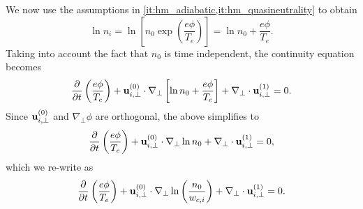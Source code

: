 \documentclass[oneside,a4paper,11pt]{report}
\begin{document}
We now use the assumptions in \cref{it:hm_adiabatic,it:hm_quasineutrality} to obtain
\begin{equation}
    \ln n_i = \ln \left [ n_0 \exp \left ( \frac{e \phi}{T_e} \right ) \right ] = \ln n_0 + \frac{e \phi}{T_e}.
\end{equation}
Taking into account the fact that $n_0$ is time independent, the continuity equation becomes
\begin{equation}
    \frac{\partial}{\partial t} \left ( \frac{e\phi}{T_e} \right ) + \mathbf{u}^{(0)}_{i,\perp} \cdot \nabla_\perp \left [ \ln n_0 + \frac{e \phi}{T_e} \right ] +  \nabla_\perp \cdot \mathbf{u}^{(1)}_{i,\perp} = 0.
\end{equation}
Since $\mathbf{u}^{(0)}_{i,\perp}$ and $\nabla_\perp \phi$ are orthogonal, the above simplifies to
\begin{equation}
    \frac{\partial}{\partial t} \left ( \frac{e\phi}{T_e} \right ) + \mathbf{u}^{(0)}_{i,\perp} \cdot \nabla_\perp \ln n_0 +  \nabla_\perp \cdot \mathbf{u}^{(1)}_{i,\perp} = 0,
\end{equation}
which we re-write as
\begin{equation}
    \label{eq:intermediate_hm_2}
    \frac{\partial}{\partial t} \left ( \frac{e\phi}{T_e} \right ) + \mathbf{u}^{(0)}_{i,\perp} \cdot \nabla_\perp \ln \left ( \frac{n_0}{w_{c,i}} \right ) +  \nabla_\perp \cdot \mathbf{u}^{(1)}_{i,\perp} = 0.
\end{equation}
\end{document}
